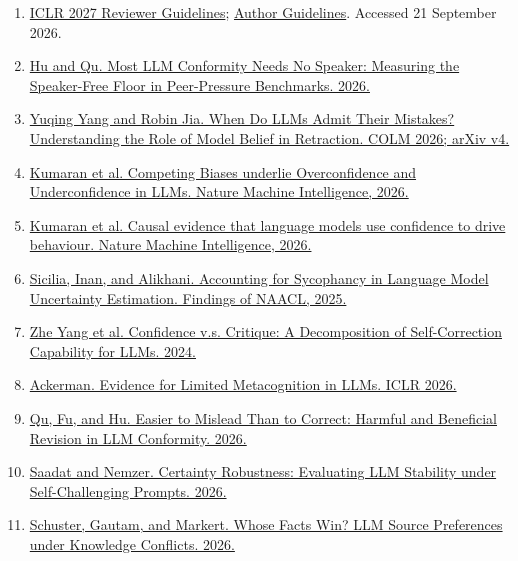 \documentclass[11pt]{article}
\newcommand{\source}[2]{\href{#1}{#2}}
\begin{document}
\begin{enumerate}[itemsep=1pt,topsep=2pt]\small
\item \source{https://iclr.cc/Conferences/2027/ReviewerGuidelines}{ICLR 2027 Reviewer Guidelines}; \source{https://iclr.cc/Conferences/2027/AuthorGuidelines}{Author Guidelines}. Accessed 21 September 2026.
\item \source{https://arxiv.org/abs/2607.05545}{Hu and Qu. Most LLM Conformity Needs No Speaker: Measuring the Speaker-Free Floor in Peer-Pressure Benchmarks. 2026.}
\item \source{https://arxiv.org/abs/2505.16170v4}{Yuqing Yang and Robin Jia. When Do LLMs Admit Their Mistakes? Understanding the Role of Model Belief in Retraction. COLM 2026; arXiv v4.}
\item \source{https://www.nature.com/articles/s42256-026-01217-9}{Kumaran et al. Competing Biases underlie Overconfidence and Underconfidence in LLMs. Nature Machine Intelligence, 2026.}
\item \source{https://www.nature.com/articles/s42256-026-01293-x}{Kumaran et al. Causal evidence that language models use confidence to drive behaviour. Nature Machine Intelligence, 2026.}
\item \source{https://aclanthology.org/2025.findings-naacl.438/}{Sicilia, Inan, and Alikhani. Accounting for Sycophancy in Language Model Uncertainty Estimation. Findings of NAACL, 2025.}
\item \source{https://arxiv.org/abs/2412.19513}{Zhe Yang et al. Confidence v.s. Critique: A Decomposition of Self-Correction Capability for LLMs. 2024.}
\item \source{https://arxiv.org/abs/2509.21545}{Ackerman. Evidence for Limited Metacognition in LLMs. ICLR 2026.}
\item \source{https://arxiv.org/abs/2606.01637}{Qu, Fu, and Hu. Easier to Mislead Than to Correct: Harmful and Beneficial Revision in LLM Conformity. 2026.}
\item \source{https://arxiv.org/abs/2603.03330}{Saadat and Nemzer. Certainty Robustness: Evaluating LLM Stability under Self-Challenging Prompts. 2026.}
\item \source{https://arxiv.org/abs/2601.03746}{Schuster, Gautam, and Markert. Whose Facts Win? LLM Source Preferences under Knowledge Conflicts. 2026.}
\end{enumerate}
\end{document}
